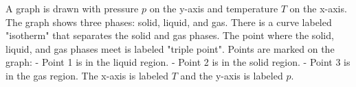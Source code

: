 A graph is drawn with pressure \( p \) on the y-axis and temperature \( T \) on the x-axis. The graph shows three phases: solid, liquid, and gas. There is a curve labeled "isotherm" that separates the solid and gas phases. The point where the solid, liquid, and gas phases meet is labeled "triple point". Points are marked on the graph:
- Point 1 is in the liquid region.
- Point 2 is in the solid region.
- Point 3 is in the gas region.
The x-axis is labeled \( T \) and the y-axis is labeled \( p \).